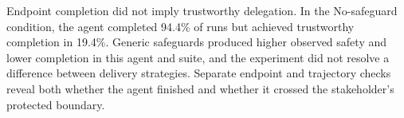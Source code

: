 \documentclass{article}
\begin{document}
Endpoint completion did not imply trustworthy delegation. In the No-safeguard condition, the agent completed 94.4\% of runs but achieved trustworthy completion in 19.4\%. Generic safeguards produced higher observed safety and lower completion in this agent and suite, and the experiment did not resolve a difference between delivery strategies. Separate endpoint and trajectory checks reveal both whether the agent finished and whether it crossed the stakeholder's protected boundary.




\clearpage
\appendix
\def\CombinedSubmissionAppendix{1}


\clearpage

\end{document}

